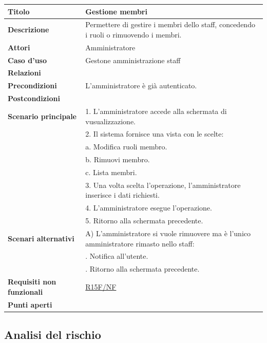 \documentclass[a4paper]{article}
\begin{document}
\begin{center}
\begin{tabularx}{1\textwidth}{|l|X|}
    \hline
	\textbf{Titolo} & Gestione membri \\
	\hline
	\textbf{Descrizione} & Permettere di gestire i membri dello staff, concedendo i ruoli o rimuovendo i membri. \\
	\hline
	\textbf{Attori} & Amministratore \\
	\hline
	\textbf{Caso d'uso} & Gestone amministrazione staff \\
	\hline
	\textbf{Relazioni} &  \\
	\hline
	\textbf{Precondizioni} &  L'amministratore è già autenticato. \\
	\hline
	\textbf{Postcondizioni} &  \\
	\hline
	\textbf{Scenario principale} & 1. L'amministratore accede alla schermata di vusualizzazione. \\
								 & 2. Il sistema fornisce una vista con le scelte: \\
								 & \quad a. Modifica ruoli membro.\\
								 & \quad b. Rimuovi membro.\\
								 & \quad c. Lista membri.\\
								 & 3. Una volta scelta l'operazione, l'amministratore inserisce i dati richiesti. \\
								 & 4. L'amministratore esegue l'operazione.\\
								 & 5. Ritorno alla schermata precedente.\\
	\hline
	\textbf{Scenari alternativi} & A) L'amministratore si vuole rimuovere ma è l'unico amministratore rimasto nello staff: \\
								 & \quad 1. Notifica all'utente. \\
								 & \quad 2. Ritorno alla schermata precedente. \\
	\hline
	\textbf{Requisiti non funzionali} & \hyperlink{R15F/NF}{R15F/NF} \\
	\hline
	\textbf{Punti aperti} & \\
	\hline
\end{tabularx}
\end{center}


\newpage

\subsection{Analisi del rischio}
\end{document}
